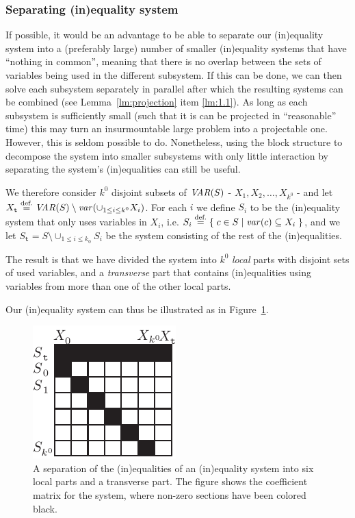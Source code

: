 \subsubsection{Separating (in)equality system}
If possible, it would be an advantage to be able to separate our (in)equality system into a (preferably large) number of smaller (in)equality systems that have ``nothing in common'', meaning that there is no overlap between the sets of variables being used in the different subsystem. If this can be done, we can then solve each subsystem separately in parallel after which the resulting systems can be combined (see Lemma~\ref{lm:projection} item \ref{lm:1.1}). As long as each subsystem is sufficiently small (such that it is can be projected in ``reasonable'' time) this may turn an insurmountable large problem into a projectable one. 
However, this is seldom possible to do. Nonetheless, using the block structure to decompose the system into smaller subsystems with only little interaction by separating the system's (in)equalities can still be useful. 
 
We therefore consider $k^0$ disjoint subsets of $\mathit{VAR}(S)$ - $X_1, X_2,\ldots, X_{k^0}$ - and let $X_{\texttt{t}}\overset{\text{def.}}= \mathit{VAR}(S)\setminus \mathit{var}(\cup_{1\leq i\leq k^0}X_i)$. For each $i$ we define $S_i$ to be the (in)equality system that only uses variables in $X_i$, i.e. $S_i \overset{\text{def.}}= \{\;{c\in S}\;|\;{\mathit{var}(c)\subseteq X_i}\;\}$, and we let $S_\texttt{t} = S\setminus \cup_{1\leq i \leq k_0}S_i$ be the system consisting of the rest of the (in)equalities. 

The result is that we have divided the system into $k^0$ \emph{local} parts with disjoint sets of used variables, and a \emph{transverse} part that contains (in)equalities using variables from more than one of the other local parts. 

Our (in)equality system can thus be illustrated as in Figure~\ref{fig:decomp1}.
\begin{figure}
	\centering
		\includegraphics{figures/decomp1B.pdf}
	\caption{A separation of the (in)equalities of an (in)equality system into six local parts and a transverse part. 
	The figure shows the coefficient matrix for the system, where non-zero sections have been colored black.}
	\label{fig:decomp1}
\end{figure}

